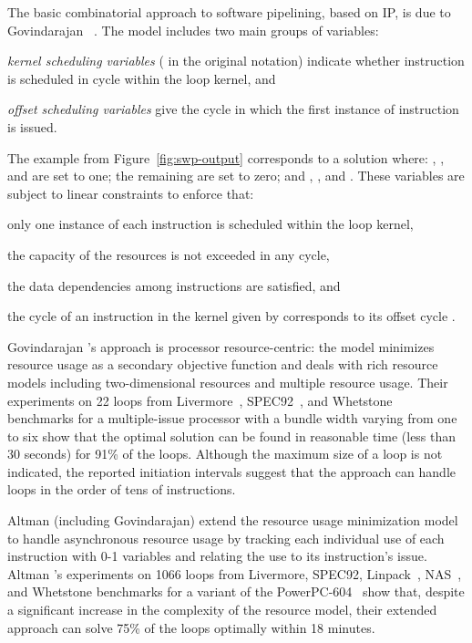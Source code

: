 \documentclass[acmsmall,authorversion,nonacm]{acmart}
\newcommand{\var}[2]{}
\begin{document}
The basic combinatorial approach to software pipelining, based on IP,
is due to Govindarajan \etal{}~\cite{Govindarajan1994}.
The model includes two main groups of variables:
\begin{inparaitem}[]
\item \emph{kernel scheduling variables} \var{a}{i,k} ( in
  the original notation) indicate whether instruction  is scheduled
  in cycle  within the loop kernel, and
\item \emph{offset scheduling variables} \var{t}{i} give the cycle
  in which the first instance of instruction  is issued.
\end{inparaitem}
The example from Figure~\ref{fig:swp-output} corresponds to a solution
where: \var{a}{\InstrLoad{},0}, \var{a}{\InstrAdd{},0}, and
\var{a}{\InstrInc{},1} are set to one; the remaining \var{a}{i,k} are
set to zero; and ,
, and .
These variables are subject to linear constraints to enforce that:
\begin{inparaitem}[]
\item only one instance of each instruction is scheduled within the
  loop kernel,
\item the capacity of the resources is not exceeded in any cycle,
\item the data dependencies among instructions are satisfied, and
\item the cycle of an instruction  in the kernel given by
  \var{a}{i,k} corresponds to its offset cycle \var{t}{i}.
\end{inparaitem}
Govindarajan \etal{}'s approach is processor resource-centric: the
model minimizes resource usage as a secondary objective function and
deals with rich resource models including two-dimensional resources
and multiple resource usage.
Their experiments on 22 loops from Livermore~\cite{McMahon1986},
SPEC92~\cite{CPU}, and Whetstone~\cite{Curnow1976} benchmarks for a
multiple-issue processor with a bundle width varying from one to six
show that the optimal solution can be found in reasonable time (less
than 30 seconds) for 91\% of the loops.
Although the maximum size of a loop is not indicated, the reported
initiation intervals suggest that the approach can handle loops in
the order of tens of instructions.


Altman \etal{} (including Govindarajan) extend the resource usage
minimization model~\cite{Altman1995} to handle asynchronous resource
usage by tracking each individual use of each instruction with 0-1
variables and relating the use to its instruction's issue.
Altman \etal{}'s experiments on 1066 loops from Livermore, SPEC92,
Linpack~\cite{Dongarra2003}, NAS~\cite{Bailey1985}, and Whetstone
benchmarks for a variant of the PowerPC-604~\cite{Diefendorff1994}
show that, despite a significant increase in the complexity of the
resource model, their extended approach can solve 75\% of the loops
optimally within 18 minutes.
\end{document}
